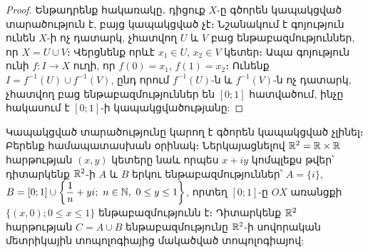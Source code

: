 \documentclass[./main.tex]{subfiles}
\begin{document}
\begin{proof}
Ենթադրենք հակառակը․ դիցուք $X$-ը գծորեն կապակցված տա\-րա\-ծություն է, բայց կապակցված չէ։ Նշա\-նա\-կում է գոյություն ունեն $X$-ի ոչ դատարկ, չհատ\-վող $U$ և $V$ բաց են\-թա\-բազ\-մութ\-յուն\-ներ, որ $X=U\cup V$։ Վերցնենք որևէ ${x_1 \in U}$, $x_2 \in V$ կետեր։ Ապա գոյություն ունի $f :I\rightarrow X$ ուղի, որ $f(0)=x_1$, $f(1)=x_2$։ Ունենք $I=f^{-1}(U) \cup f^{-1}(V)$, ընդ որում $f^{-1}(U)$-ն և $f^{-1}(V)$-ն ոչ դատարկ, չհատվող բաց ենթաբազմություններ են $[0;1]$ հատվածում, ինչը հակասում է $[0;1]$-ի կապա\-կց\-վա\-ծու\-թյանը:
\end{proof}

\par Կապակցված տարածությունը կարող է գծորեն կապակցված չլինել։ Բերենք հա\-մա\-պատասխան օրինակ։ Ներկայացնելով $\mathbb{R}^2=\mathbb{R}\times \mathbb{R}$ հարթության $(x,y)$ կե\-տե\-րը նաև որպես $x+iy$ կոմպլեքս թվեր՝ դիտարկենք $\mathbb{R}^2$-ի $A$ և $B$ երկու են\-թա\-բազ\-մութ\-յուն\-ներ՝ $A=\{i\}$, $B=[0;1]\cup \left\{\dfrac{1}{n}+yi;\ n \in \mathbb{N},\ 0\leq y\leq 1\right\}$, որտեղ $[0;1]$-ը $OX$ առանցքի $\{(x,0);  0\leq x\leq 1\}$ են\-թա\-բազ\-մութ\-յունն է։ Դիտարկենք $\mathbb{R}^2$ հարթության $C=A\cup B$ ենթաբազմությունը $\mathbb{R}^2$-ի սո\-վո\-րա\-կան մետրիկային տոպոլոգիայից մակածված տո\-պո\-լո\-գիա\-յով: 
\end{document}
